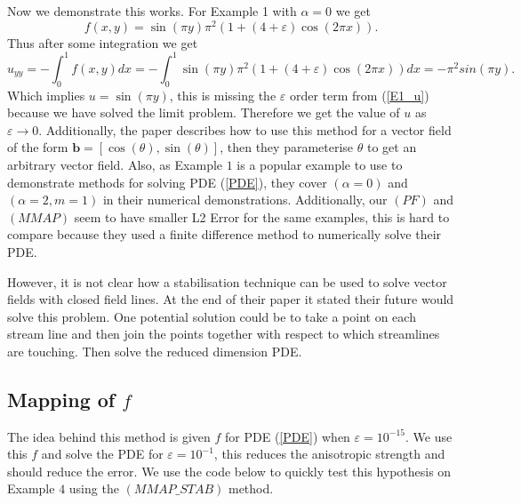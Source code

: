 \documentclass[12pt]{ociamthesis}
\begin{document}
Now we demonstrate this works. For Example 1 with $\alpha = 0$ we get 
\begin{equation}
f(x,y) = \sin(\pi y)\pi^2(1+(4+\varepsilon)\cos(2\pi x)) .
\end{equation}
Thus after some integration we get
\begin{equation}
u_{yy} = - \int_0^1 f(x,y)dx = - \int_0^1 \sin(\pi y)\pi^2(1+(4+\varepsilon)\cos(2\pi x)) dx = -\pi^2 sin(\pi y).
\end{equation}
Which implies $u= \sin(\pi y)$, this is missing the $\varepsilon$ order term from (\ref{E1_u}) because we have solved the limit problem. Therefore we get the value of $u$ as $\varepsilon \rightarrow 0$. Additionally, the paper \cite{LINE_INT} describes how to use this method for a vector field of the form $\mathbf{b} = [\cos(\theta), \sin(\theta)]$, then they parameterise $\theta$ to get an arbitrary vector field. Also, as Example $1$ is a popular example to use to demonstrate methods for solving PDE (\ref{PDE}), they cover $(\alpha = 0)$ and $(\alpha=2, m=1)$ in their numerical demonstrations. Additionally, our $(PF)$ and $(MMAP)$ seem to have smaller L2 Error for the same examples, this is hard to compare because they used a finite difference method to numerically solve their PDE.
 
 However, it is not clear how a stabilisation technique can be used to solve vector fields with closed field lines. At the end of their paper it stated their future would solve this problem. One potential solution could be to take a point on each stream line and then join the points together with respect to which streamlines are touching. Then solve the reduced dimension PDE.

\subsection{Mapping of $f$} \label{MAP_f}
The idea behind this method is given $f$ for PDE (\ref{PDE}) when $\varepsilon = 10^{-15}$. We use this $f$ and solve the PDE for $\varepsilon = 10^{-1}$, this reduces the anisotropic strength and should reduce the error. We use the code below to quickly test this hypothesis on Example $4$ using the $(MMAP\_STAB)$ method.
\end{document}
